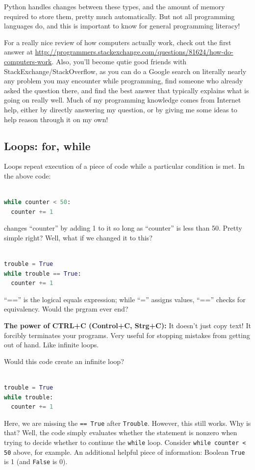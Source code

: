 \documentclass[a4paper,10pt]{scrartcl}
\begin{document}
Python handles changes between these types, and the amount of memory required to store them, pretty much automatically. But not all programming languages do, and this is important to know for general programming literacy!

\begin{framed}
For a really nice review of how computers actually work, check out the first answer at \url{http://programmers.stackexchange.com/questions/81624/how-do-computers-work}. Also, you'll become qutie good friends with StackExchange/StackOverflow, as you can do a Google search on literally nearly any problem you may encounter while programming, find someone who already asked the question there, and find the best answer that typically explains what is going on really well. Much of my programming knowledge comes from Internet help, either by directly answering my question, or by giving me some ideas to help reason through it on my own!
\end{framed}

\subsection{Loops: for, while}
\label{s:loops}

Loops repeat execution of a piece of code while a particular condition is met. In the above code:
\begin{lstlisting}[belowskip=-1.6\baselineskip, language=python]

while counter < 50:
  counter += 1
\end{lstlisting}
changes ``counter'' by adding 1 to it so long as ``counter'' is less than 50. Pretty simple right? Well, what if we changed it to this?
\begin{lstlisting}[belowskip=-1.6\baselineskip, language=python]

trouble = True
while trouble == True:
  counter += 1
\end{lstlisting}
``=='' is the logical equals expression; while ``='' assigns values, ``=='' checks for equivalency. Would the prgram ever end?

\begin{framed}
\textbf{The power of CTRL+C (Control+C, Strg+C):} It doesn't just copy text! It forcibly terminates your programs. Very useful for stopping mistakes from getting out of hand. Like infinite loops.
\end{framed}

Would this code create an infinite loop?
\begin{lstlisting}[belowskip=-1.6\baselineskip, language=python]

trouble = True
while trouble:
  counter += 1
\end{lstlisting}
Here, we are missing the \lstinline{== True} after \lstinline{Trouble}. However, this still works. Why is that? Well, the code simply evaluates whether the statement is nonzero when trying to decide whether to continue the \lstinline{while} loop. Consider \lstinline{while counter < 50} above, for example. An additional helpful piece of information: Boolean \lstinline{True} is 1 (and \lstinline{False} is 0).
\end{document}
